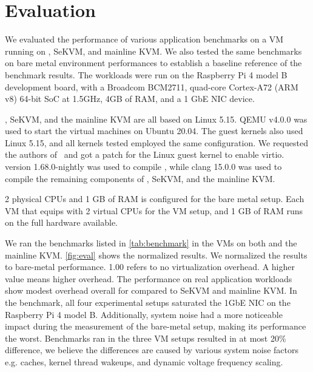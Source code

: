 \chapter{Evaluation}
\label{sec:eval}

We evaluated the performance of various application benchmarks
on a VM running on \rustsec{}, SeKVM, and mainline KVM.
We also tested the same
benchmarks on bare metal environment performances to establish a baseline
reference of the benchmark results. The workloads were run on the Raspberry
Pi 4 model B development board, with a Broadcom BCM2711, quad-core
Cortex-A72 (ARM v8) 64-bit SoC at 1.5GHz, 4GB of RAM, and a 1 GbE NIC device.

\rustsec{}, SeKVM, and the mainline KVM are all based on Linux 5.15.
QEMU v4.0.0 was used to start the virtual machines on Ubuntu 20.04. The guest
kernels also used Linux 5.15, and all kernels tested employed the same 
configuration. We requested the authors of~\cite{hypsec} and got a patch for
the Linux guest kernel to enable virtio.
 version 1.68.0-nightly was used to compile \rustcore{},
while clang 15.0.0 was used to compile the remaining components of
\rustsec{}, SeKVM, and the mainline KVM.

2 physical CPUs and 1 GB of RAM is configured for the bare
metal setup. Each VM that equips with 2 virtual CPUs for the VM setup, and 1
GB of RAM runs on the full hardware available.

We ran the benchmarks listed in \autoref{tab:benchmark} in the VMs on both
\rustsec{} and the mainline KVM. \autoref{fig:eval} shows the normalized
results. We normalized the results to bare-metal performance. 1.00 refers
to no virtualization overhead.
A higher value means higher overhead. The performance on real application
workloads show modest overhead overall for \rustsec{} compared to SeKVM and
mainline KVM.
In the  benchmark, all four experimental setups saturated the
1GbE NIC on the Raspberry Pi 4 model B. Additionally, system noise had a more
noticeable impact during the measurement of the bare-metal setup, making its
performance the worst.
Benchmarks ran in the three VM setups resulted in at most 20\% difference,
we believe the differences are caused by various system noise factors e.g.
caches, kernel thread wakeups, and dynamic voltage frequency scaling.

